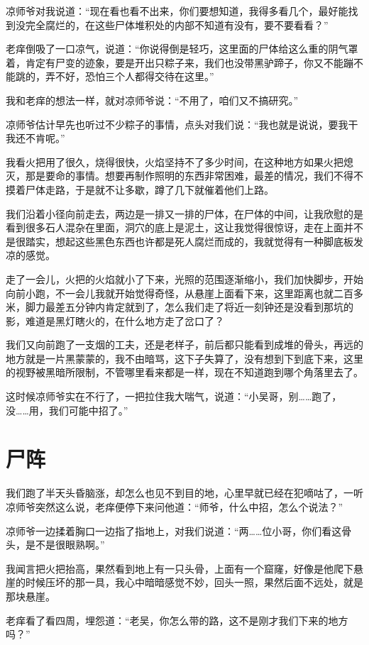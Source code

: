 凉师爷对我说道：“现在看也看不出来，你们要想知道，我得多看几个，最好能找到没完全腐烂的，在这些尸体堆积处的内部不知道有没有，要不要看看？”

老痒倒吸了一口凉气，说道：“你说得倒是轻巧，这里面的尸体给这么重的阴气罩着，肯定有尸变的迹象，要是开出只粽子来，我们也没带黑驴蹄子，你又不能蹦不能跳的，弄不好，恐怕三个人都得交待在这里。”

我和老痒的想法一样，就对凉师爷说：“不用了，咱们又不搞研究。”

凉师爷估计早先也听过不少粽子的事情，点头对我们说：“我也就是说说，要我干我还不肯呢。”

我看火把用了很久，烧得很快，火焰坚持不了多少时间，在这种地方如果火把熄灭，那是要命的事情。想要再制作照明的东西非常困难，最差的情况，我们不得不摸着尸体走路，于是就不让多歇，蹲了几下就催着他们上路。

我们沿着小径向前走去，两边是一排又一排的尸体，在尸体的中间，让我欣慰的是看到很多石人混杂在里面，洞穴的底上是泥土，这让我觉得很惊讶，走在上面并不是很踏实，想起这些黑色东西也许都是死人腐烂而成的，我就觉得有一种脚底板发凉的感觉。

走了一会儿，火把的火焰就小了下来，光照的范围逐渐缩小，我们加快脚步，开始向前小跑，不一会儿我就开始觉得奇怪，从悬崖上面看下来，这里距离也就二百多米，脚力最差五分钟内肯定就到了，怎么我们走了将近一刻钟还是没看到那坑的影，难道是黑灯瞎火的，在什么地方走了岔口了？

我们又向前跑了一支烟的工夫，还是老样子，前后都只能看到成堆的骨头，再远的地方就是一片黑蒙蒙的，我不由暗骂，这下子失算了，没有想到下到底下来，这里的视野被黑暗所限制，不管哪里看来都是一样，现在不知道跑到哪个角落里去了。

这时候凉师爷实在不行了，一把拉住我大喘气，说道：“小吴哥，别……跑了，没……用，我们可能中招了。”

\chapter{尸阵}

我们跑了半天头昏脑涨，却怎么也见不到目的地，心里早就已经在犯嘀咕了，一听凉师爷突然这么说，老痒便停下来问他道：“师爷，什么中招，怎么个说法？”

凉师爷一边揉着胸口一边指了指地上，对我们说道：“两……位小哥，你们看这骨头，是不是很眼熟啊。”

我闻言把火把抬高，果然看到地上有一只头骨，上面有一个窟窿，好像是他爬下悬崖的时候压坏的那一具，我心中暗暗感觉不妙，回头一照，果然后面不远处，就是那块悬崖。

老痒看了看四周，埋怨道：“老吴，你怎么带的路，这不是刚才我们下来的地方吗？”

